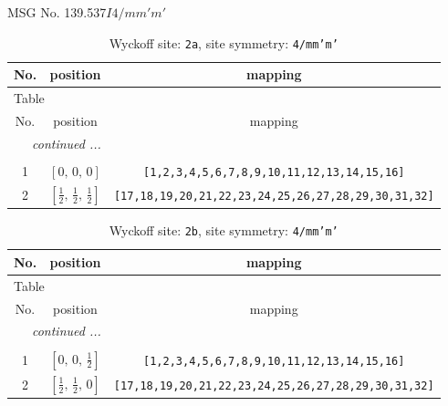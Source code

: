 \documentclass[fleqn,8pt]{jsarticle}
\begin{document}
\setcounter{MaxMatrixCols}{32}

\renewcommand{\tablename}{Table~}
\renewcommand{\figurename}{Figure~}
\begin{center}
\LARGE
MSG No. 139.537\quad$I4/mm'm'$
\end{center}
\renewcommand{\arraystretch}{1.2}
\begin{longtable}{ccc}
\caption{Wyckoff site: {\tt 2a}, site symmetry: {\tt 4/mm'm'}}
 \\
 \hline \hline
No. & position & mapping \\ \hline \endfirsthead

\multicolumn{2}{l}{\tablename\ \thetable{}} \\
 \hline \hline
No. & position & mapping \\ \hline \endhead

 \hline \hline
\multicolumn{2}{r}{\footnotesize\it continued ...} \\ \endfoot

 \hline \hline
\multicolumn{2}{r}{} \\ \endlastfoot

1 & $\left[ 0,\, 0,\, 0 \right]$ & {\tt [1,2,3,4,5,6,7,8,9,10,11,12,13,14,15,16]} \\ \hline
2 & $\left[ \frac{1}{2},\, \frac{1}{2},\, \frac{1}{2} \right]$ & {\tt [17,18,19,20,21,22,23,24,25,26,27,28,29,30,31,32]} \\
\end{longtable}
\renewcommand{\arraystretch}{1.2}
\begin{longtable}{ccc}
\caption{Wyckoff site: {\tt 2b}, site symmetry: {\tt 4/mm'm'}}
 \\
 \hline \hline
No. & position & mapping \\ \hline \endfirsthead

\multicolumn{2}{l}{\tablename\ \thetable{}} \\
 \hline \hline
No. & position & mapping \\ \hline \endhead

 \hline \hline
\multicolumn{2}{r}{\footnotesize\it continued ...} \\ \endfoot

 \hline \hline
\multicolumn{2}{r}{} \\ \endlastfoot

1 & $\left[ 0,\, 0,\, \frac{1}{2} \right]$ & {\tt [1,2,3,4,5,6,7,8,9,10,11,12,13,14,15,16]} \\ \hline
2 & $\left[ \frac{1}{2},\, \frac{1}{2},\, 0 \right]$ & {\tt [17,18,19,20,21,22,23,24,25,26,27,28,29,30,31,32]} \\
\end{longtable}
\end{document}
